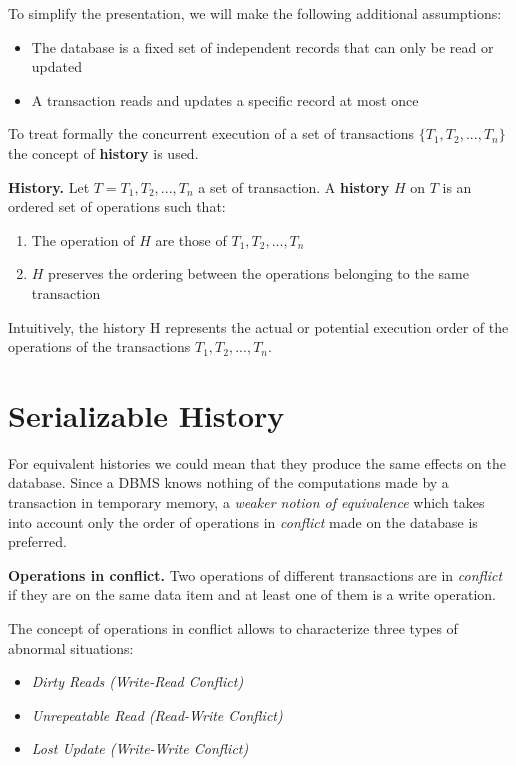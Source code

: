 To simplify the presentation, we will make the following additional assumptions:
\begin{itemize}
    \item The database is a fixed set of independent records that can only be read or updated
    \item A transaction reads and updates a specific record at most once
\end{itemize}

To treat formally the concurrent execution of a set of transactions $\{T_1,T_2,...,T_n\}$ the concept of \textbf{history} is used.
\begin{tcolorbox}
\textbf{History.} Let $T = {T_1, T_2,...,T_n}$ a set of transaction. A \textbf{history} $H$ on $T$ is an ordered
set of operations such that:
\begin{enumerate}
    \item The operation of $H$ are those of $T_1, T_2,...,T_n$
    \item $H$ preserves the ordering between the operations belonging to the same transaction
\end{enumerate}
Intuitively, the history H represents the actual or potential execution order of the operations of the transactions $T_1, T_2,...,T_n$.
\end{tcolorbox}

\section{Serializable History}
For equivalent histories we could mean that they produce the same effects on the database. Since a DBMS knows nothing of the computations made by a transaction in temporary memory, a \textit{weaker notion of equivalence} which takes into account only the order of operations in \textit{conflict} made on the database is preferred.
\begin{tcolorbox}
\textbf{Operations in conflict.} Two operations of different transactions are in \textit{conflict} if they are on the same data item and at least one of them is a write operation.
\end{tcolorbox}
The concept of operations in conflict allows to characterize three types of abnormal situations:
\begin{itemize}
    \item \textit{Dirty Reads (Write-Read Conflict)} 
    \item \textit{Unrepeatable Read (Read-Write Conflict)}
    \item \textit{Lost Update (Write-Write Conflict)} 
\end{itemize}

